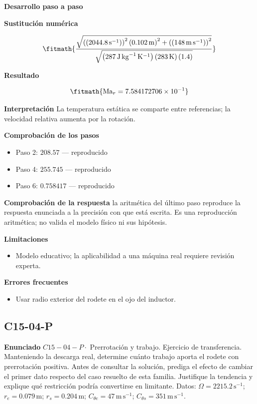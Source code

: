 \documentclass[10pt,openany]{book}
\begin{document}
\noindent\textbf{Desarrollo paso a paso}



\noindent\textbf{Sustitución numérica}

\[
\fitmath{\frac{\sqrt{\left(\left(2044.8\,\mathrm{s}^{-1}\right)\right)^{2} \left(0.102\,\mathrm{m}\right)^{2} + \left(\left(148\,\mathrm{m}\,\mathrm{s}^{-1}\right)\right)^{2}}}{\sqrt{\left(287\,\mathrm{J}\,\mathrm{kg}^{-1}\,\mathrm{K}^{-1}\right) \left(283\,\mathrm{K}\right) \left(1.4\right)}}}
\]

\noindent\textbf{Resultado}

\[
\fitmath{\mathrm{Ma}_r=7.584172706\times10^{-1}}
\]

\noindent\textbf{Interpretación}
La temperatura estática se comparte entre referencias; la velocidad relativa aumenta por la rotación.

\noindent\textbf{Comprobación de los pasos}
\begin{itemize}
\item Paso 2: $208.57$ — reproducido
\item Paso 4: $255.745$ — reproducido
\item Paso 6: $0.758417$ — reproducido
\end{itemize}

\noindent\textbf{Comprobación de la respuesta} la aritmética del último paso reproduce la respuesta enunciada a la precisión con que está escrita. Es una reproducción aritmética; no valida el modelo físico ni sus hipótesis.

\noindent\textbf{Limitaciones}
\begin{itemize}
\item Modelo educativo; la aplicabilidad a una máquina real requiere revisión experta.
\end{itemize}

\noindent\textbf{Errores frecuentes}
\begin{itemize}
\item Usar radio exterior del rodete en el ojo del inductor.
\end{itemize}
\subsection*{C15-04-P}

\noindent\textbf{Enunciado}
\(C15-04-P \cdot\) Prerrotación y trabajo. Ejercicio de transferencia. Manteniendo la descarga real, determine cuánto trabajo aporta el rodete con prerrotación positiva. Antes de consultar la solución, prediga el efecto de cambiar el primer dato respecto del caso resuelto de esta familia. Justifique la tendencia y explique qué restricción podría convertirse en limitante. Datos: \(\Omega=2215.2\, \mathrm{s}^{-1}\); \(r_e=0.079\, \mathrm{m}\); \(r_s=0.204\, \mathrm{m}\); \(C_{\theta e}=47\, \mathrm{m}\,\mathrm{s}^{-1}\); \(C_{\theta s}=351\, \mathrm{m}\,\mathrm{s}^{-1}\).
\end{document}
